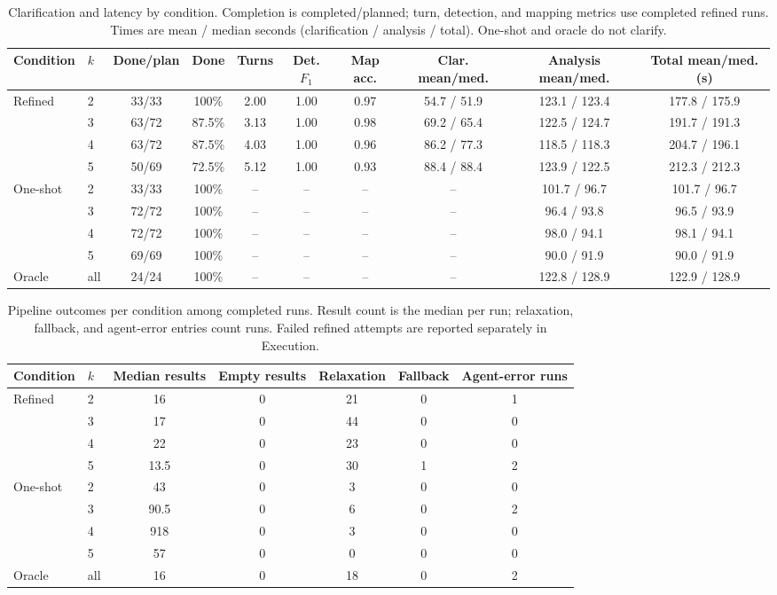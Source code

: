 \documentclass[sigconf,review]{acmart}
\begin{document}
\begin{table}[t]
\caption{Clarification and latency by condition. Completion is
completed/planned; turn, detection, and mapping metrics use completed
refined runs. Times are mean / median seconds (clarification / analysis /
total). One-shot and oracle do not clarify.}
\label{tab:clarification-ops}
\centering\scriptsize\setlength{\tabcolsep}{3pt}
\begin{tabular}{@{}llcccccccc@{}}
\toprule
Condition & $k$ & Done/plan & Done & Turns & Det. $F_1$ & Map acc. & Clar. mean/med. & Analysis mean/med. & Total mean/med. (s)\\
\midrule
Refined & 2 & 33/33 & 100\% & 2.00 & 1.00 & 0.97 & 54.7 / 51.9 & 123.1 / 123.4 & 177.8 / 175.9\\
 & 3 & 63/72 & 87.5\% & 3.13 & 1.00 & 0.98 & 69.2 / 65.4 & 122.5 / 124.7 & 191.7 / 191.3\\
 & 4 & 63/72 & 87.5\% & 4.03 & 1.00 & 0.96 & 86.2 / 77.3 & 118.5 / 118.3 & 204.7 / 196.1\\
 & 5 & 50/69 & 72.5\% & 5.12 & 1.00 & 0.93 & 88.4 / 88.4 & 123.9 / 122.5 & 212.3 / 212.3\\
One-shot & 2 & 33/33 & 100\% & -- & -- & -- & -- & 101.7 / 96.7 & 101.7 / 96.7\\
 & 3 & 72/72 & 100\% & -- & -- & -- & -- & 96.4 / 93.8 & 96.5 / 93.9\\
 & 4 & 72/72 & 100\% & -- & -- & -- & -- & 98.0 / 94.1 & 98.1 / 94.1\\
 & 5 & 69/69 & 100\% & -- & -- & -- & -- & 90.0 / 91.9 & 90.0 / 91.9\\
Oracle & all & 24/24 & 100\% & -- & -- & -- & -- & 122.8 / 128.9 & 122.9 / 128.9\\
\bottomrule
\end{tabular}
\end{table}

\begin{table}[t]
\caption{Pipeline outcomes per condition among completed runs. Result
count is the median per run; relaxation, fallback, and agent-error entries
count runs. Failed refined attempts are reported separately in Execution.}
\label{tab:ops}
\centering\scriptsize\setlength{\tabcolsep}{6pt}
\begin{tabular}{@{}llccccc@{}}
\toprule
Condition & $k$ & Median results & Empty results & Relaxation & Fallback & Agent-error runs\\
\midrule
Refined & 2 & 16 & 0 & 21 & 0 & 1\\
 & 3 & 17 & 0 & 44 & 0 & 0\\
 & 4 & 22 & 0 & 23 & 0 & 0\\
 & 5 & 13.5 & 0 & 30 & 1 & 2\\
One-shot & 2 & 43 & 0 & 3 & 0 & 0\\
 & 3 & 90.5 & 0 & 6 & 0 & 2\\
 & 4 & 918 & 0 & 3 & 0 & 0\\
 & 5 & 57 & 0 & 0 & 0 & 0\\
Oracle & all & 16 & 0 & 18 & 0 & 2\\
\bottomrule
\end{tabular}
\end{table}
\end{document}
